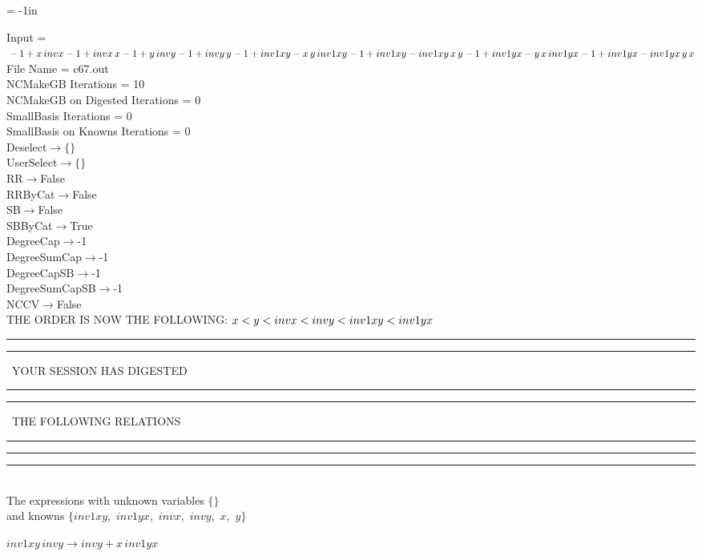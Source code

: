 \voffset = -1in
\evensidemargin 0.1in
\oddsidemargin 0.1in
\textheight 9in
\textwidth 6in

\normalsize
\baselineskip=12pt
\noindent
Input = 
$
\\-1 + x\,
 invx\\
-1 + invx\,
 x\\
-1 + y\,
 invy\\
-1 + invy\,
 y\\
-1 + inv1xy - x\,
 y\,
 inv1xy\\
-1 + inv1xy - inv1xy\,
 x\,
 y\\
-1 + inv1yx - y\,
 x\,
 inv1yx\\
-1 + inv1yx - inv1yx\,
 y\,
 x\\
$
File Name = c67.out\\
NCMakeGB Iterations = 10\\
NCMakeGB on Digested Iterations = 0\\
SmallBasis Iterations = 0\\
SmallBasis on Knowns Iterations = 0\\
Deselect$\rightarrow \{\}$\\
UserSelect$\rightarrow \{\}$\\
RR$\rightarrow $False\\
RRByCat$\rightarrow $False\\
SB$\rightarrow $False\\
SBByCat$\rightarrow $True\\
DegreeCap$\rightarrow $-1\\
DegreeSumCap$\rightarrow $-1\\
DegreeCapSB$\rightarrow $-1\\
DegreeSumCapSB$\rightarrow $-1\\
NCCV$\rightarrow $False\\
THE ORDER IS NOW THE FOLLOWING:\hfil\break
$
x<y<invx<invy<inv1xy<inv1yx\\
$
\rule[2pt]{6in}{4pt}\hfil\break
\rule[2pt]{1.879in}{4pt}
\ YOUR SESSION HAS DIGESTED\ 
\rule[2pt]{1.879in}{4pt}\hfil\break
\rule[2pt]{1.923in}{4pt}
\ THE FOLLOWING RELATIONS\ 
\rule[2pt]{1.923in}{4pt}\hfil\break
\rule[2pt]{6in}{4pt}\hfil\break
\rule[3pt]{6in}{.7pt}\\
The expressions with unknown variables $\{\}$\\
and knowns $\{inv1xy,
$ $
inv1yx,
$ $
invx,
$ $
invy,
$ $
x,
$ $
y\}$\smallskip\\
\begin{minipage}{6in}
$
inv1xy\,
 invy\rightarrow invy + x\,
 inv1yx
$
\end{minipage}\medskip \\
